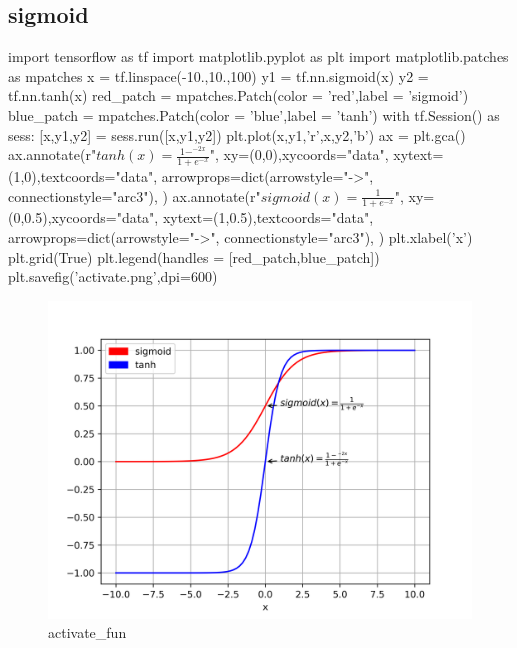 \subsection{sigmoid}
\begin{python}
import tensorflow as tf 
import matplotlib.pyplot as plt 
import matplotlib.patches as mpatches
x = tf.linspace(-10.,10.,100)
y1 = tf.nn.sigmoid(x)
y2 = tf.nn.tanh(x)
red_patch = mpatches.Patch(color = 'red',label = 'sigmoid')
blue_patch = mpatches.Patch(color = 'blue',label = 'tanh')
with tf.Session() as sess:
	[x,y1,y2] = sess.run([x,y1,y2])
plt.plot(x,y1,'r',x,y2,'b')
ax = plt.gca()
ax.annotate(r"$tanh(x) = \frac{1-^{-2x}}{1+e^{-x}}$",
	   xy=(0,0),xycoords="data",
	   xytext=(1,0),textcoords="data",
	   arrowprops=dict(arrowstyle="->",
	   connectionstyle="arc3"),
)
ax.annotate(r"$sigmoid(x) = \frac{1}{1+e^{-x}}$",
	   xy=(0,0.5),xycoords="data",
	   xytext=(1,0.5),textcoords="data",
	   arrowprops=dict(arrowstyle="->",
	   connectionstyle="arc3"),
)
plt.xlabel('x')
plt.grid(True)
plt.legend(handles = [red\_patch,blue\_patch])
plt.savefig('activate.png',dpi=600)
\end{python}
\begin{figure}[H]
\centering
\includegraphics[scale=0.8]{./pic/chapter1/activate_fun.png}
\caption{activate\_fun}
\end{figure}
